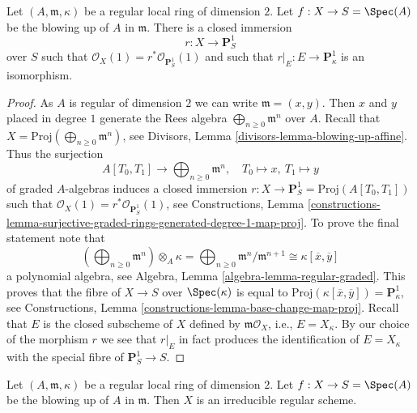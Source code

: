 \begin{lemma}
\label{lemma-blowup}
Let $(A, \mathfrak m, \kappa)$ be a regular local ring of dimension $2$.
Let $f : X \to S = \Spec(A)$ be the blowing up of $A$ in $\mathfrak m$.
There is a closed immersion
$$
r : X \longrightarrow \mathbf{P}^1_S
$$
over $S$ such that $\mathcal{O}_X(1) = r^*\mathcal{O}_{\mathbf{P}^1_S}(1)$
and such that $r|_E : E \to \mathbf{P}^1_\kappa$ is an isomorphism.
\end{lemma}

\begin{proof}
As $A$ is regular of dimension $2$ we can write $\mathfrak m = (x, y)$.
Then $x$ and $y$ placed in degree $1$ generate the Rees algebra
$\bigoplus_{n \geq 0} \mathfrak m^n$ over $A$. Recall that
$X = \text{Proj}(\bigoplus_{n \geq 0} \mathfrak m^n)$, see
Divisors, Lemma \ref{divisors-lemma-blowing-up-affine}.
Thus the surjection
$$
A[T_0, T_1] \longrightarrow \bigoplus\nolimits_{n \geq 0} \mathfrak m^n,
\quad
T_0 \mapsto x,\ T_1 \mapsto y
$$
of graded $A$-algebras induces a closed immersion
$r : X \to \mathbf{P}^1_S = \text{Proj}(A[T_0, T_1])$
such that $\mathcal{O}_X(1) = r^*\mathcal{O}_{\mathbf{P}^1_S}(1)$, see
Constructions, Lemma
\ref{constructions-lemma-surjective-graded-rings-generated-degree-1-map-proj}.
To prove the final statement note that
$$
\left(\bigoplus\nolimits_{n \geq 0} \mathfrak m^n\right) \otimes_A \kappa =
\bigoplus\nolimits_{n \geq 0} \mathfrak m^n/\mathfrak m^{n + 1} \cong
\kappa[\overline{x}, \overline{y}]
$$
a polynomial algebra, see Algebra, Lemma \ref{algebra-lemma-regular-graded}.
This proves that the fibre of $X \to S$ over $\Spec(\kappa)$ is equal to
$\text{Proj}(\kappa[\overline{x}, \overline{y}]) = \mathbf{P}^1_\kappa$, see
Constructions, Lemma \ref{constructions-lemma-base-change-map-proj}.
Recall that $E$ is the closed subscheme of $X$ defined by
$\mathfrak m\mathcal{O}_X$, i.e., $E = X_\kappa$.
By our choice of the morphism $r$ we see that $r|_E$ in fact
produces the identification of $E = X_\kappa$ with the special
fibre of $\mathbf{P}^1_S \to S$.
\end{proof}

\begin{lemma}
\label{lemma-blowup-regular}
Let $(A, \mathfrak m, \kappa)$ be a regular local ring of dimension $2$.
Let $f : X \to S = \Spec(A)$ be the blowing up of $A$ in $\mathfrak m$.
Then $X$ is an irreducible regular scheme.
\end{lemma}

